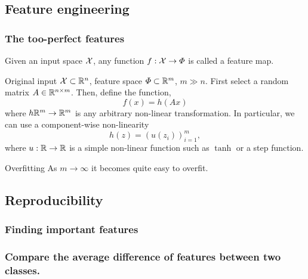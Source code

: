 \subsection{Feature engineering}

\begin{frame}
  \frametitle{The too-perfect features}
  \begin{definition}
    Given an input space ${\mathcal{X}}$, any function $f : {\mathcal{X}} \to \Phi$ is called a feature map.
  \end{definition}

  \begin{example}
    Original input ${\mathcal{X}} \subset {\mathbb{R}}^n$, feature space $\Phi \subset {\mathbb{R}}^m$, $m \gg n$. First select a random matrix $A \in {\mathbb{R}}^{n \times m}$. Then, define the function,
    \[
      f(x) = h(Ax)
    \]
    where $h {\mathbb{R}}^m \to {\mathbb{R}}^m$ is any arbitrary non-linear transformation. In particular, we can use a component-wise non-linearity
    \[
      h(z) = \left(u(z_i)\right)_{i=1}^m,
    \]
    where $u : {\mathbb{R}} \to {\mathbb{R}}$ is a simple non-linear function such as $\tanh$ or a step function. 
  \end{example}
  \begin{alertblock}{Overfitting}
    As $m \to \infty$ it becomes quite easy to overfit.
  \end{alertblock}
\end{frame}

\subsection{Reproducibility}
\begin{frame}
  \frametitle{Finding important features}
\end{frame}

\begin{frame}
  \frametitle{Compare the average difference of features between two classes.}
\end{frame}

